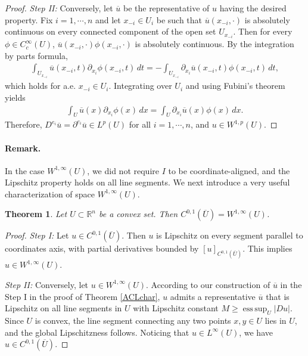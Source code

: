 \documentclass{article}
\numberwithin{equation}{section}
\newcommand{\bbR}{\mathbb{R}}
\newcommand{\ol}{\overline}
\DeclareMathOperator{\esssup}{ess\,sup}
\theoremstyle{plain}
\newtheorem{theorem}{Theorem}[section]
\theoremstyle{definition}
\begin{document}
\begin{proof}
\textit{Step II:} Conversely, let $\ol{u}$ be the representative of $u$ having the desired property. Fix $i=1,\cdots,n$ and let $x_{-i}\in U_i$ be such that $\ol{u}(x_{-i},\cdot)$ is absolutely continuous on every connected component of the open set $U_{x_{-i}}$. Then for every $\phi\in C^\infty_c(U)$, $\ol{u}(x_{-i},\cdot)\phi(x_{-i},\cdot)$ is absolutely continuous. By the integration by parts formula,
\begin{align*}
	\int_{U_{x_{-i}}}\ol{u}(x_{-i},t)\partial_{x_i}\phi(x_{-i},t)\,dt=-\int_{U_{x_{-i}}}\partial_{x_i}\ol{u}(x_{-i},t)\phi(x_{-i},t)\,dt,
\end{align*}
which holds for a.e. $x_{-i}\in U_i$. Integrating over $U_i$ and using Fubini's theorem yields
\begin{align*}
	\int_U\ol{u}(x)\partial_{x_i}\phi(x)\,dx=\int_U\partial_{x_i}\ol{u}(x)\phi(x)\,dx.
\end{align*}
Therefore, $D^{e_i}\ol{u}=\partial^{e_i}\ol{u}\in L^p(U)$ for all $i=1,\cdots,n$, and $u\in W^{1,p}(U)$.
\end{proof}
\paragraph{Remark.} In the case $W^{1,\infty}(U)$, we did not require $I$
to be coordinate-aligned, and the Lipschitz property holds on all line segments. We next introduce a very useful characterization of space $W^{1,\infty}(U)$.

\begin{theorem}\label{thm:2.15}
Let $U\subset\bbR^n$ be a convex set. Then $C^{0,1}(\ol{U})=W^{1,\infty}(U)$.
\end{theorem}
\begin{proof}
\textit{Step I:} Let $u\in C^{0,1}(\ol{U})$. Then $u$ is Lipschitz on every segment parallel to coordinates axis, with partial derivatives bounded by $[u]_{C^{0,1}(\ol{U})}$. This implies $u\in W^{1,\infty}(U)$.

\textit{Step II:} Conversely, let $u\in W^{1,\infty}(U)$. According to our construction of $\ol{u}$ in the Step I in the proof of Theorem \ref{ACLchar}, $u$ admits a representative $\ol{u}$ that is Lipschitz on all line segments in $U$ with Lipschitz constant $M\geq\esssup_U\vert Du\vert$. Since $U$ is convex, the line segment connecting any two points $x,y\in U$ lies in $U$, and the global Lipschitzness follows. Noticing that $u\in L^\infty(U)$, we have $u\in C^{0,1}(\ol{U})$.
\end{proof}
\end{document}
